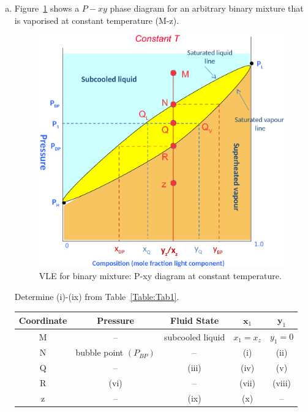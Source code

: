\documentclass[calculator,allquestions,datasheet,mock,Pens]{exam_newMarcus2}
\begin{document}
\begin{question}
  \begin{enumerate}[a)]
    \item Figure~\ref{Figure:Fig1} shows a $P-xy$ phase diagram for an arbitrary binary mixture that is vaporised at constant temperature (M-z).
      \begin{figure}[h]
        \begin{center}
          \includegraphics[width=.5\linewidth,clip]{./Pics/VLE_Pxy_Diagram3b}
          \caption{VLE for binary mixture: P-xy diagram at constant temperature.}\label{Figure:Fig1}
        \end{center}
      \end{figure}
      Determine (i)-(ix) from Table~\ref{Table:Tab1}.
      \begin{table}[h]
        \begin{center}
          \begin{tabular}{||c| c | c | c | c ||}
            \hline\hline
            {\bf Coordinate} & {\bf Pressure} & {\bf Fluid State} & $\mathbf{x}_{1}$ & $\mathbf{y}_{1}$ \\
            \hline
                 M           &   --           &   subcooled liquid & $x_{1}=x_{z}$    & $y_{1}=0$        \\
                 N           &bubble point $\left(P_{BP}\right)$&--& (i)             & (ii)            \\
                 Q           &  --            &     (iii)          & (iv)             & (v)            \\
                 R           &  (vi)          &     --             & (vii)             & (viii)            \\
                 z           &  --           &     (ix)            & (x)         &  --            \\                 
            \hline\hline

\end{tabular}
\end{center}
\end{table}
\end{enumerate}
\end{question}
\end{document}
